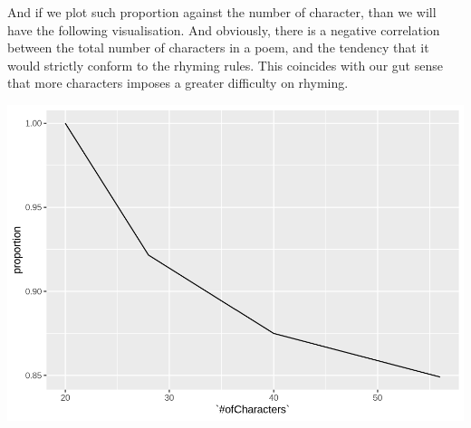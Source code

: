 \documentclass[]{article}
\newenvironment{Shaded}{\begin{snugshade}}{\end{snugshade}}
\newcommand{\DataTypeTok}[1]{\textcolor[rgb]{0.13,0.29,0.53}{#1}}
\newcommand{\DecValTok}[1]{\textcolor[rgb]{0.00,0.00,0.81}{#1}}
\newcommand{\ErrorTok}[1]{\textcolor[rgb]{0.64,0.00,0.00}{\textbf{#1}}}
\newcommand{\KeywordTok}[1]{\textcolor[rgb]{0.13,0.29,0.53}{\textbf{#1}}}
\newcommand{\NormalTok}[1]{#1}
\newcommand{\OperatorTok}[1]{\textcolor[rgb]{0.81,0.36,0.00}{\textbf{#1}}}
\newcommand{\StringTok}[1]{\textcolor[rgb]{0.31,0.60,0.02}{#1}}
\begin{document}
And if we plot such proportion against the number of character, than we
will have the following visualisation. And obviously, there is a
negative correlation between the total number of characters in a poem,
and the tendency that it would strictly conform to the rhyming rules.
This coincides with our gut sense that more characters imposes a greater
difficulty on rhyming.

\begin{Shaded}
\end{Shaded}

\includegraphics{main_files/figure-latex/unnamed-chunk-11-1.pdf}
\end{document}
